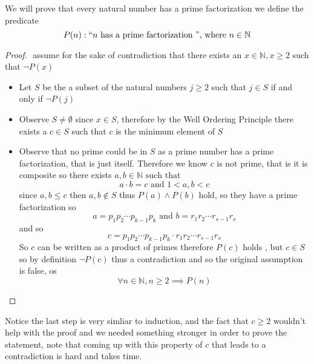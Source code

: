 \documentclass[11pt]{book}
\begin{document}
We will prove that every natural number has a prime factorization we define the predicate 
\[
    P(n): `` n \text{ has a prime factorization  }  "\text{, where } n \in \mathbb{N} 
\]

\begin{proof}
$ $\newline
    assume for the sake of contradiction that there exists an $x \in \mathbb{N}, x \ge 2$ such that $\neg P\left(x\right) $ 
    \begin{itemize}
        \item Let $S$ be the a subset of the natural numbers $j \ge 2$ such that $j\in S$ if and only if $\neg P\left(j\right) $ 
        \item Observe $S \neq \emptyset $ since $x \in S$, therefore by the Well Ordering Principle there exists a $c \in S$ such that $c$ is the minimum element of $S$
        \item Observe that no prime could be in $S$ as a prime number has a prime factorization, that is just itself. Therefore we know $c$ is not prime, that is it is composite so there exists $a, b \in \mathbb{N} \text{ such that } $ 
            \[
            a \cdot b = c \text{ and } 1 < a, b < c
            \]
            since $a, b \le c$ then $a, b \not\in S$ thus $P\left(a\right) \land P\left(b\right) $ hold, so they have a prime factorization so 
            \[
            a = p_1 p_2 \dotsb p_{k - 1} p_{k} \text{ and } b = r_1 r_2 \dotsb r_{s - 1} r_{s}
            \]
            and so 
            \[
            c = p_1 p_2 \dotsb p_{k - 1} p_{k}  \cdot r_1 r_2 \dotsb r_{s - 1} r_{s}
            \]
            So $c$ can be written as a product of primes therefore $P\left(c\right) $ holds , but $c \in S$ so by definition $\neg P\left(c\right) $ thus a contradiction and so the original assumption is false, os 
            \[
                \forall n \in \mathbb{N}, n \ge 2 \implies P\left(n\right) 
            \]
    \end{itemize}
\end{proof}

\begin{note}
    Notice the last step is very simliar to induction, and the fact that $c \ge 2$ wouldn't help with the proof and we needed something stronger in order to prove the statement, note that coming up with this property of $c$ that leads to a contradiction is hard and takes time.
\end{note}

\end{document}
